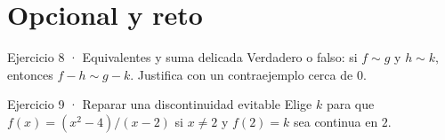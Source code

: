 \documentclass[10pt,a4paper,oneside,openany]{book}
\begin{document}
\section*{Opcional y reto}
\begin{PSevenOptionalFixed}{Ejercicio 8 · Equivalentes y suma delicada}
Verdadero o falso: si \(f\sim g\) y \(h\sim k,\) entonces \(f-h\sim g-k\). Justifica con un contraejemplo cerca de \(0\).
\end{PSevenOptionalFixed}
\begin{PSevenOptionalFixed}{Ejercicio 9 · Reparar una discontinuidad evitable}
Elige \(k\) para que \(f(x)=(x^{2}-4)/(x-2)\) si \(x\ne 2\) y \(f(2)=k\) sea continua en \(2\).
\end{PSevenOptionalFixed}
\end{document}
